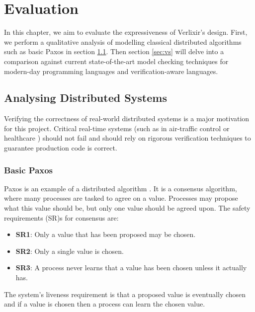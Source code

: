 \chapter{Evaluation} \label{chap:eval}
In this chapter, we aim to evaluate the expressiveness of Verlixir's design. First, we perform a qualitative analysis of modelling classical distributed algorithms such as basic Paxos in section \ref{sec:ds}. Then section \ref{sec:vs} will delve into a comparison against current state-of-the-art model checking techniques for modern-day programming languages and verification-aware languages.
\section{Analysing Distributed Systems} \label{sec:ds}
Verifying the correctness of real-world distributed systems is a major motivation for this project. Critical real-time systems (such as in air-traffic control or healthcare  \cite{airlines,healthcare}) should not fail and should rely on rigorous verification techniques to guarantee production code is correct.  
\subsection{Basic Paxos} \label{sec:Paxos}
Paxos is an example of a distributed algorithm \cite{paxos_simple}. It is a consensus algorithm, where many processes are tasked to agree on a value. Processes may propose what this value should be, but only one value should be agreed upon. The safety requirements (SR)s for consensus are:
\begin{itemize}
    \item \textbf{SR1}: Only a value that has been proposed may be chosen.
    \item \textbf{SR2}: Only a single value is chosen.
    \item \textbf{SR3}: A process never learns that a value has been chosen unless it actually has.
\end{itemize}
The system's liveness requirement is that a proposed value is eventually chosen and if a value is chosen then a process can learn the chosen value.
